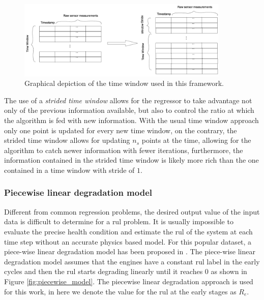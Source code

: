 \begin{figure}[!htb]
\centering
\includegraphics[width=0.9\textwidth]{../img/time_window.png}
\caption{Graphical depiction of the time window used in this framework.}
\label{fig:time_window}
\end{figure}

The use of a \textit{strided time window} allows for the regressor to take advantage not only of the previous information available, but also to control the ratio at which the algorithm is fed with new information. With the usual time window approach only one point is updated for every new time window, on the contrary, the strided time window allows for updating $n_s$ points at the time, allowing for the algorithm to catch newer information with fewer iterations, furthermore, the information contained in the strided time window is likely more rich than the one contained in a time window with stride of $1$.

\subsubsection{Piecewise linear degradation model}

Different from common regression problems, the desired output value of the input data is difficult to determine for a \gls{rul} problem. It is usually impossible to evaluate the precise health condition and estimate the \gls{rul} of the system at each time step without an accurate physics based model. For this popular dataset, a piece-wise linear degradation model has been proposed in \citep{Ramasso2014}. The piece-wise linear degradation model assumes that the engines have a constant \gls{rul} label in the early cycles and then the \gls{rul} starts degrading linearly until it reaches 0 as shown in Figure \ref{fig:piecewise_model}. The piecewise linear degradation approach is used for this work, in here we denote the value for the \gls{rul} at the early stages as $R_e$. 

